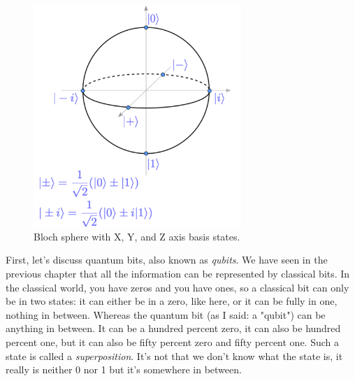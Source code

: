 \begin{figure}[H]
    \centering
    \includegraphics[width=0.7\textwidth]{lesson2/bloch_sphere_annotated.pdf}
    
        \caption{Bloch sphere with X, Y, and Z axis basis states.}
    
    \label{fig:annotated-bloch}
\end{figure}


First, let's discuss quantum bits, also known as \emph{qubits}. We have seen in the previous chapter that all the information can be represented by classical bits. In the classical world, you have zeros and you have ones, so a classical bit can only be in two states: it can either be in a zero, like here, or it can be fully in one, nothing in between. Whereas the quantum bit (as I said: a "qubit") can be anything in between. It can be a hundred percent zero, it can also be hundred percent one, but it can also be fifty percent zero and fifty percent one. Such a state is called a \emph{superposition}. It's not that we don't know what the state is, it really is neither 0 nor 1 but it's somewhere in between.

